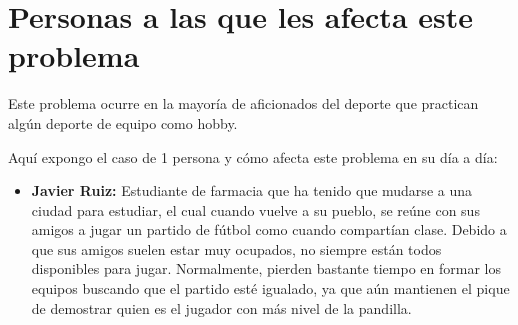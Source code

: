 \section{Personas a las que les afecta este problema}

Este problema ocurre en la mayoría de aficionados del deporte que practican algún deporte de equipo como hobby.

Aquí expongo el caso de 1 persona y cómo afecta este problema en su día a día:

\begin{itemize}
    \item \textbf{Javier Ruiz:} Estudiante de farmacia que ha tenido que mudarse a una ciudad para estudiar, el cual cuando vuelve a su pueblo,
     se reúne con sus amigos a jugar un partido de fútbol como cuando compartían clase. Debido a que sus amigos suelen estar muy ocupados,
     no siempre están todos disponibles para jugar. Normalmente, pierden bastante tiempo en formar los equipos buscando que el partido esté igualado,
     ya que aún mantienen el pique de demostrar quien es el jugador con más nivel de la pandilla. 
\end{itemize}
